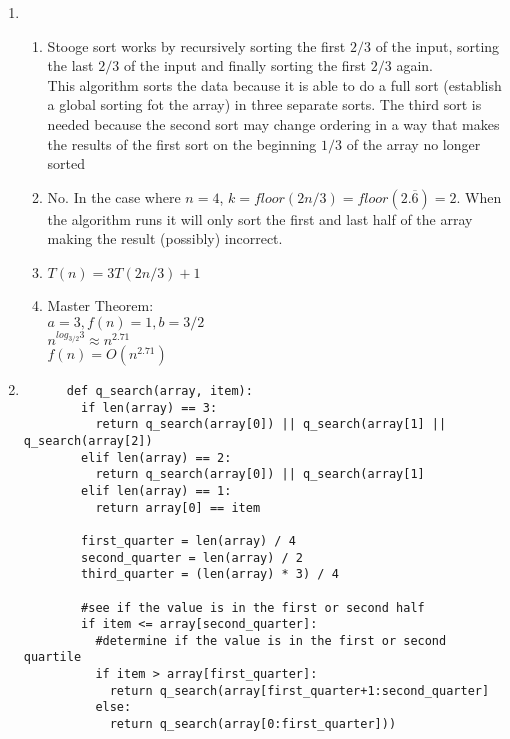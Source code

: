 \documentclass{article}
\begin{document}
\begin{enumerate}
\begin{enumerate}
    \end{enumerate}
    \item\begin{enumerate}
      \item Stooge sort works by recursively sorting the first $2/3$ of the input, sorting the last $2/3$ of the input and finally sorting the first $2/3$ again.\\
      This algorithm sorts the data because it is able to do a full sort (establish a global sorting fot the array) in three separate sorts.  The third sort is needed because the second sort may change ordering in a way that makes the results of the first sort on the beginning $1/3$ of the array no longer sorted
      \item No.  In the case where $n=4$, $k = floor(2n/3) = floor(2.\overline{6}) = 2$.  When the algorithm runs it will only sort the first and last half of the array making the result (possibly) incorrect.
      \item $T(n) = 3T(2n/3) + 1$
      \item Master Theorem:\\ 
        $a=3, f(n)=1, b=3/2$\\
        $n^{log_{3/2}3} \approx n^{2.71}$\\
        $f(n) = O(n^{2.71})$
    \end{enumerate}
    \item\begin{verbatim}
      def q_search(array, item):
        if len(array) == 3:
          return q_search(array[0]) || q_search(array[1] || q_search(array[2])
        elif len(array) == 2:
          return q_search(array[0]) || q_search(array[1]
        elif len(array) == 1:
          return array[0] == item

        first_quarter = len(array) / 4
        second_quarter = len(array) / 2
        third_quarter = (len(array) * 3) / 4

        #see if the value is in the first or second half
        if item <= array[second_quarter]:
          #determine if the value is in the first or second quartile
          if item > array[first_quarter]:
            return q_search(array[first_quarter+1:second_quarter]
          else:
            return q_search(array[0:first_quarter]))


\end{verbatim}
\end{enumerate}
\end{document}
